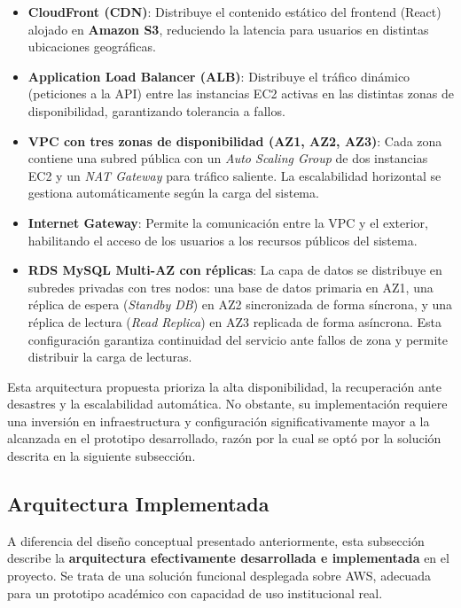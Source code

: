 \documentclass[12pt]{article}
\begin{document}
{\begin{itemize}
    \item \textbf{CloudFront (CDN)}: Distribuye el contenido estático del frontend
    (React) alojado en \textbf{Amazon S3}, reduciendo la latencia para usuarios en
    distintas ubicaciones geográficas.

    \item \textbf{Application Load Balancer (ALB)}: Distribuye el tráfico dinámico
    (peticiones a la API) entre las instancias EC2 activas en las distintas zonas de
    disponibilidad, garantizando tolerancia a fallos.

    \item \textbf{VPC con tres zonas de disponibilidad (AZ1, AZ2, AZ3)}: Cada zona
    contiene una subred pública con un \textit{Auto Scaling Group} de dos instancias
    EC2 y un \textit{NAT Gateway} para tráfico saliente. La escalabilidad horizontal
    se gestiona automáticamente según la carga del sistema.

    \item \textbf{Internet Gateway}: Permite la comunicación entre la VPC y el exterior,
    habilitando el acceso de los usuarios a los recursos públicos del sistema.

    \item \textbf{RDS MySQL Multi-AZ con réplicas}: La capa de datos se distribuye en
    subredes privadas con tres nodos: una base de datos primaria en AZ1, una réplica
    de espera (\textit{Standby DB}) en AZ2 sincronizada de forma síncrona, y una
    réplica de lectura (\textit{Read Replica}) en AZ3 replicada de forma asíncrona.
    Esta configuración garantiza continuidad del servicio ante fallos de zona y
    permite distribuir la carga de lecturas.
\end{itemize}

Esta arquitectura propuesta prioriza la alta disponibilidad, la recuperación ante
desastres y la escalabilidad automática. No obstante, su implementación requiere
una inversión en infraestructura y configuración significativamente mayor a la
alcanzada en el prototipo desarrollado, razón por la cual se optó por la solución
descrita en la siguiente subsección.

\subsection{Arquitectura Implementada}

A diferencia del diseño conceptual presentado anteriormente, esta subsección describe
la \textbf{arquitectura efectivamente desarrollada e implementada} en el proyecto.
Se trata de una solución funcional desplegada sobre AWS, adecuada para un prototipo
académico con capacidad de uso institucional real.

}
\end{document}
